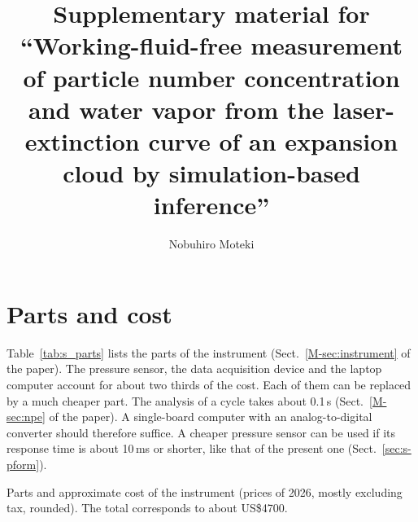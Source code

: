 \documentclass[12pt]{article}
\title{Supplementary material for ``Working-fluid-free measurement of particle number concentration
and water vapor from the laser-extinction curve of an expansion cloud by simulation-based inference''}
\author{Nobuhiro Moteki}
\date{}
\begin{document}
\maketitle

\section{Parts and cost}
\label{sec:s-parts}
Table~\ref{tab:s_parts} lists the parts of the instrument (Sect.~\ref{M-sec:instrument} of the paper). The
pressure sensor, the data acquisition device and the laptop computer account for about two thirds of the
cost. Each of them can be replaced by a much cheaper part. The analysis of a cycle takes about 0.1\,s
(Sect.~\ref{M-sec:npe} of the paper). A single-board computer with an analog-to-digital converter should
therefore suffice. A cheaper pressure sensor can be used if its response time is about 10\,ms or
shorter, like that of the present one (Sect.~\ref{sec:s-pform}).

\begin{table}[!htbp]
\centering
\caption{Parts and approximate cost of the instrument (prices of 2026, mostly excluding tax,
rounded). The total corresponds to about US\$4700.}
\label{tab:s_parts}
\begin{adjustbox}{max width=\textwidth}\small\end{adjustbox}
\end{table}
\end{document}
